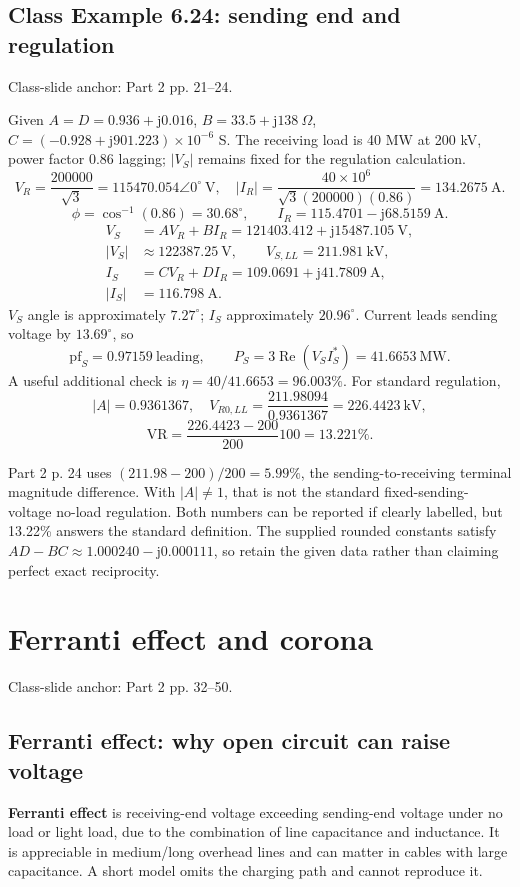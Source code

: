 \documentclass[11pt,a4paper]{article}
\newenvironment{Caution}[1]{\begin{tcolorbox}[colback=warm,colframe=rust,coltitle=white,title={#1}]}{\end{tcolorbox}}
\newcommand{\slides}[1]{{\small\color{muted}\textsf{Class-slide anchor: #1.}}\par}
\newcommand{\chapterstart}[2]{\clearpage\section{#1}\label{#2}}
\newcommand{\ans}[1]{\boxed{#1}}
\newcommand{\jj}{\mathrm j}
\begin{document}
\subsection{Class Example 6.24: sending end and regulation}
\slides{Part 2 pp. 21--24}
Given $A=D=0.936+\jj0.016$, $B=33.5+\jj138\ \Omega$, $C=(-0.928+\jj901.223)\times10^{-6}$ S. The receiving load is 40 MW at 200 kV, power factor 0.86 lagging; $|V_S|$ remains fixed for the regulation calculation.
\[
 V_R=\frac{200000}{\sqrt3}=115470.054\angle0^\circ\ \mathrm V,
 \quad |I_R|=\frac{40\times10^6}{\sqrt3(200000)(0.86)}=134.2675\ \mathrm A.
\]
\[
 \phi=\cos^{-1}(0.86)=30.68^\circ,\qquad
 I_R=115.4701-\jj68.5159\ \mathrm A.
\]
\[
 \begin{aligned}
 V_S&=AV_R+BI_R=121403.412+\jj15487.105\ \mathrm V,\\
 |V_S|&\approx122387.25\ \mathrm V,\qquad
 \ans{V_{S,LL}=211.981\ \mathrm{kV}},\\
 I_S&=CV_R+DI_R=109.0691+\jj41.7809\ \mathrm A,\\
 \ans{|I_S|}&=\ans{116.798\ \mathrm A}.
 \end{aligned}
\]
$V_S$ angle is approximately $7.27^\circ$; $I_S$ approximately $20.96^\circ$. Current leads sending voltage by $13.69^\circ$, so
\[
 \ans{\mathrm{pf}_S=0.97159\ \text{leading}},\qquad
 P_S=3\operatorname{Re}(V_SI_S^*)=\ans{41.6653\ \mathrm{MW}}.
\]
A useful additional check is $\eta=40/41.6653=\ans{96.003\%}$. For standard regulation,
\[
 |A|=0.9361367,\quad V_{R0,LL}=\frac{211.98094}{0.9361367}=226.4423\ \mathrm{kV},
\]
\[
 \ans{\mathrm{VR}=\frac{226.4423-200}{200}100=13.221\%}.
\]
\begin{Caution}{Why the slide's 5.99\% differs}
Part 2 p. 24 uses $(211.98-200)/200=5.99\%$, the sending-to-receiving terminal magnitude difference. With $|A|\ne1$, that is not the standard fixed-sending-voltage no-load regulation. Both numbers can be reported if clearly labelled, but 13.22\% answers the standard definition. The supplied rounded constants satisfy $AD-BC\approx1.000240-\jj0.000111$, so retain the given data rather than claiming perfect exact reciprocity.
\end{Caution}
\chapterstart{Ferranti effect and corona}{phenomena}
\slides{Part 2 pp. 32--50}
\subsection{Ferranti effect: why open circuit can raise voltage}
\textbf{Ferranti effect} is receiving-end voltage exceeding sending-end voltage under no load or light load, due to the combination of line capacitance and inductance. It is appreciable in medium/long overhead lines and can matter in cables with large capacitance. A short model omits the charging path and cannot reproduce it.
\end{document}
